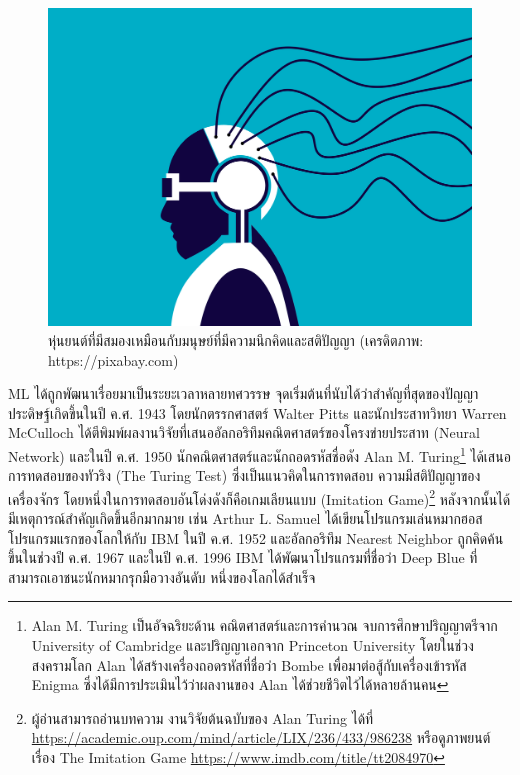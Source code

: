 \begin{figure}[htbp]
    \centering
    \includegraphics[width=0.8\linewidth]{fig/cyborg.png}
    \caption{หุ่นยนต์ที่มีสมองเหมือนกับมนุษย์ที่มีความนึกคิดและสติปัญญา (เครดิตภาพ: https://pixabay.com)}
    \label{fig:cyborg}
\end{figure}

ML ได้ถูกพัฒนาเรื่อยมาเป็นระยะเวลาหลายทศวรรษ จุดเริ่มต้นที่นับได้ว่าสำคัญที่สุดของปัญญาประดิษฐ์เกิดขึ้นในปี ค.ศ. 1943 โดยนักตรรกศาสตร์
Walter Pitts และนักประสาทวิทยา Warren McCulloch ได้ตีพิมพ์ผลงานวิจัยที่เสนออัลกอริทึมคณิตศาสตร์ของโครงข่ายประสาท (Neural 
Network) และในปี ค.ศ. 1950 นักคณิตศาสตร์และนักถอดรหัสชื่อดัง Alan M. Turing\footnote{Alan M. Turing เป็นอัจฉริยะด้าน%
คณิตศาสตร์และการคำนวณ จบการศึกษาปริญญาตรีจาก University of Cambridge และปริญญาเอกจาก Princeton University 
โดยในช่วงสงครามโลก Alan ได้สร้างเครื่องถอดรหัสที่ชื่อว่า Bombe เพื่อมาต่อสู้กับเครื่องเข้ารหัส Enigma ซึ่งได้มีการประเมินไว้ว่าผลงานของ Alan 
ได้ช่วยชีวิตไว้ได้หลายล้านคน} ได้เสนอการทดสอบของทัวริง (The Turing Test)\autocite{turing1950} ซึ่งเป็นแนวคิดในการทดสอบ%
ความมีสติปัญญาของเครื่องจักร โดยหนึ่งในการทดสอบอันโด่งดังก็คือเกมเลียนแบบ (Imitation Game)\footnote{ผู้อ่านสามารถอ่านบทความ%
งานวิจัยต้นฉบับของ Alan Turing ได้ที่ \url{https://academic.oup.com/mind/article/LIX/236/433/986238} หรือดูภาพยนต์เรื่อง 
The Imitation Game \url{https://www.imdb.com/title/tt2084970}} หลังจากนั้นได้มีเหตุการณ์สำคัญเกิดขึ้นอีกมากมาย เช่น 
Arthur L. Samuel ได้เขียนโปรแกรมเล่นหมากฮอสโปรแกรมแรกของโลกให้กับ IBM ในปี ค.ศ. 1952 และอัลกอริทึม Nearest Neighbor 
ถูกคิดค้นขึ้นในช่วงปี ค.ศ. 1967 และในปี ค.ศ. 1996 IBM ได้พัฒนาโปรแกรมที่ชื่อว่า Deep Blue ที่สามารถเอาชนะนักหมากรุกมือวางอันดับ%
หนึ่งของโลกได้สำเร็จ

